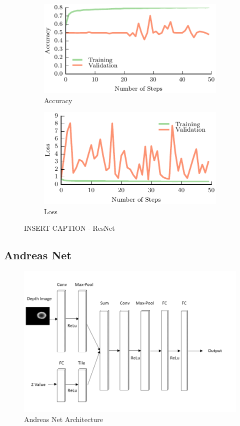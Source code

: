 \begin{figure}[t!]
    \centering
    \begin{subfigure}[t]{0.49\textwidth}
        \includegraphics[width=0.9\columnwidth]{figs/res_net_accuracy.pdf}
        \caption{Accuracy} \label{fig:accuracy}
        \end{subfigure}
    \begin{subfigure}[t]{0.49\textwidth}
        \includegraphics[width=0.9\columnwidth]{figs/res_net_loss.pdf}
        \caption{Loss} \label{fig:loss}
    \end{subfigure}
\caption{INSERT CAPTION - ResNet} \label{fig:resnet_results}
\end{figure}

\subsection{Andreas Net}

\begin{figure}[t!]
    \includegraphics[width=0.99\columnwidth]{figs/andreas_net.png}
\caption{Andreas Net Architecture} \label{fig:andreas_net}
\end{figure}

